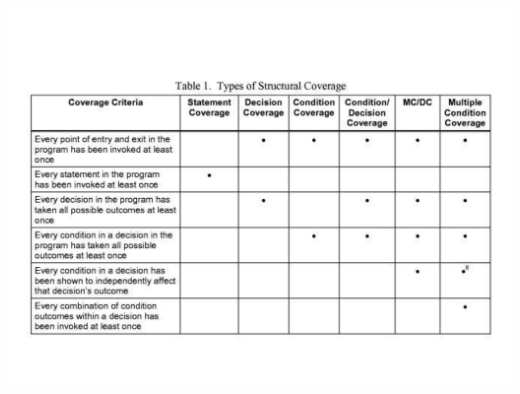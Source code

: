 \documentclass[a4paper]{article}
\begin{document}
\begin{multicols}{3}
        \includegraphics[width=\linewidth]{152.pdf}\\
    \end{multicols}
    
\end{document}
